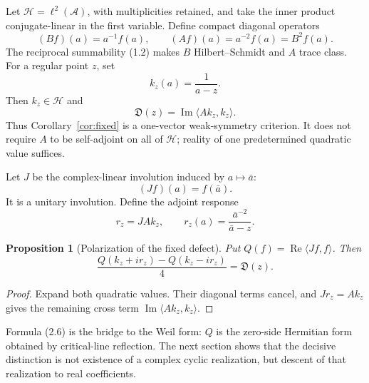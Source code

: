 \documentclass[11pt]{article}
\newtheorem{proposition}[theorem]{Proposition}
\theoremstyle{definition}
\theoremstyle{remark}
\newcommand{\cA}{\mathcal A}
\newcommand{\cH}{\mathcal H}
\newcommand{\Rea}{\operatorname{Re}}
\newcommand{\Ima}{\operatorname{Im}}
\newcommand{\ip}[2]{\langle #1,#2\rangle}
\begin{document}
Let $\cH=\ell^2(\cA)$, with multiplicities retained, and take the inner product conjugate-linear
in the first variable.  Define compact diagonal operators
\begin{equation}
 (Bf)(a)=a^{-1}f(a),
 \qquad
 (Af)(a)=a^{-2}f(a)=B^2f(a).                              \tag{2.1}
\end{equation}
The reciprocal summability (1.2) makes $B$ Hilbert--Schmidt and $A$ trace class.  For a regular
point $z$, set
\begin{equation}
 k_z(a)=\frac1{a-z}.                                      \tag{2.2}
\end{equation}
Then $k_z\in\cH$ and
\begin{equation}
 \mathfrak D(z)=\Ima\ip{Ak_z}{k_z}.                      \tag{2.3}
\end{equation}
Thus Corollary~\ref{cor:fixed} is a one-vector weak-symmetry criterion.  It does not require
$A$ to be self-adjoint on all of $\cH$; reality of one predetermined quadratic value suffices.

Let $J$ be the complex-linear involution induced by $a\mapsto\bar a$:
\begin{equation}
 (Jf)(a)=f(\bar a).                                       \tag{2.4}
\end{equation}
It is a unitary involution.  Define the adjoint response
\begin{equation}
 r_z=JAk_z,
 \qquad
 r_z(a)=\frac{\bar a^{-2}}{\bar a-z}.                    \tag{2.5}
\end{equation}

\begin{proposition}[Polarization of the fixed defect]
\label{prop:polarization}
Put $Q(f)=\Rea\ip{Jf}{f}$.  Then
\begin{equation}
 \frac{Q(k_z+i r_z)-Q(k_z-i r_z)}4=\mathfrak D(z).        \tag{2.6}
\end{equation}
\end{proposition}

\begin{proof}
Expand both quadratic values.  Their diagonal terms cancel, and $Jr_z=Ak_z$ gives the remaining
cross term $\Ima\ip{Ak_z}{k_z}$.
\end{proof}

Formula (2.6) is the bridge to the Weil form: $Q$ is the zero-side Hermitian form obtained by
critical-line reflection.  The next section shows that the decisive distinction is not existence
of a complex cyclic realization, but descent of that realization to real coefficients.
\end{document}
